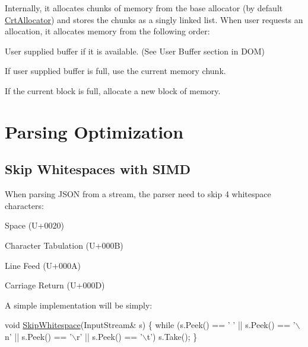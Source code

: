 Internally, it allocates chunks of memory from the base allocator (by default {\ttfamily \hyperlink{class_crt_allocator}{Crt\+Allocator}}) and stores the chunks as a singly linked list. When user requests an allocation, it allocates memory from the following order\+:


\begin{DoxyEnumerate}
\item User supplied buffer if it is available. (See User Buffer section in D\+OM)
\item If user supplied buffer is full, use the current memory chunk.
\item If the current block is full, allocate a new block of memory.
\end{DoxyEnumerate}\hypertarget{md_Cadriciel_Commun_Externe_RapidJSON_doc_internals_ParsingOptimization}{}\section{Parsing Optimization}\label{md_Cadriciel_Commun_Externe_RapidJSON_doc_internals_ParsingOptimization}
\hypertarget{md_Cadriciel_Commun_Externe_RapidJSON_doc_internals_SkipwhitespaceWithSIMD}{}\subsection{Skip Whitespaces with S\+I\+MD}\label{md_Cadriciel_Commun_Externe_RapidJSON_doc_internals_SkipwhitespaceWithSIMD}
When parsing J\+S\+ON from a stream, the parser need to skip 4 whitespace characters\+:


\begin{DoxyEnumerate}
\item Space ({\ttfamily U+0020})
\item Character Tabulation ({\ttfamily U+000B})
\item Line Feed ({\ttfamily U+000A})
\item Carriage Return ({\ttfamily U+000D})
\end{DoxyEnumerate}

A simple implementation will be simply\+: 
\begin{DoxyCode}
\textcolor{keywordtype}{void} \hyperlink{reader_8h_a60338858b2582eca23f3e509a2d82e0e}{SkipWhitespace}(InputStream& s) \{
    \textcolor{keywordflow}{while} (s.Peek() == \textcolor{charliteral}{' '} || s.Peek() == \textcolor{charliteral}{'\(\backslash\)n'} || s.Peek() == \textcolor{charliteral}{'\(\backslash\)r'} || s.Peek() == \textcolor{charliteral}{'\(\backslash\)t'})
        s.Take();
\}
\end{DoxyCode}


